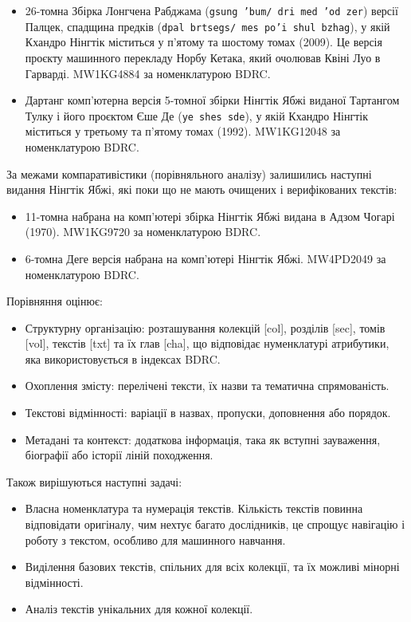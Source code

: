 \documentclass{article}
\begin{document}
\begingroup\raggedright
\begin{itemize}
\item 26-томна Збірка Лонгчена Рабджама (\texttt{gsung 'bum/ dri med 'od zer}) версії Палцек, спадщина предків (\texttt{dpal brtsegs/ mes po'i shul bzhag}),
      у якій Кхандро Нінгтік міститься у п'ятому та шостому томах (2009). Це версія проєкту машинного перекладу Норбу Кетака,
      який очолював Квіні Луо в Гарварді. MW1KG4884 за номенклатурою BDRC.
\item Дартанг комп'ютерна версія 5-томної збірки Нінгтік Ябжі виданої Тартангом Тулку і його проєктом Єше Де (\texttt{ye shes sde}),
      у якій Кхандро Нінгтік міститься у третьому та п'ятому томах (1992). MW1KG12048 за номенклатурою BDRC.
\end{itemize}
\endgroup

За межами компаративістики (порівняльного аналізу) залишились наступні видання Нінгтік Ябжі, які поки що не мають очищених і верифікованих текстів:

\begingroup\raggedright
\begin{itemize}
\item 11-томна набрана на комп'ютері збірка Нінгтік Ябжі видана в Адзом Чогарі (1970). MW1KG9720 за номенклатурою BDRC.
\item 6-томна Деге версія набрана на комп'ютері Нінгтік Ябжі. MW4PD2049 за номенклатурою BDRC.
\end{itemize}
\endgroup

\newpage
Порівняння оцінює:

\begingroup\raggedright
\begin{itemize}
\item Структурну організацію: розташування колекцій [col], розділів [sec], томів [vol], текстів [txt] та їх глав [cha],
      що відповідає нуменклатурі атрибутики, яка використовується в індексах BDRC.
\item Охоплення змісту: перелічені тексти, їх назви та тематична спрямованість.
\item Текстові відмінності: варіації в назвах, пропуски, доповнення або порядок.
\item Метадані та контекст: додаткова інформація, така як вступні зауваження, біографії або історії ліній походження.
\end{itemize}
\endgroup

Також вирішуються наступні задачі:

\begingroup\raggedright
\begin{itemize}
\item Власна номенклатура та нумерація текстів. Кількість текстів повинна відповідати оригіналу, чим нехтує багато дослідників,
      це спрощує навігацію і роботу з текстом, особливо для машинного навчання.
\item Виділення базових текстів, спільних для всіх колекції, та їх можливі мінорні відмінності.
\item Аналіз текстів унікальних для кожної колекції.
\end{itemize}
\endgroup
\end{document}
